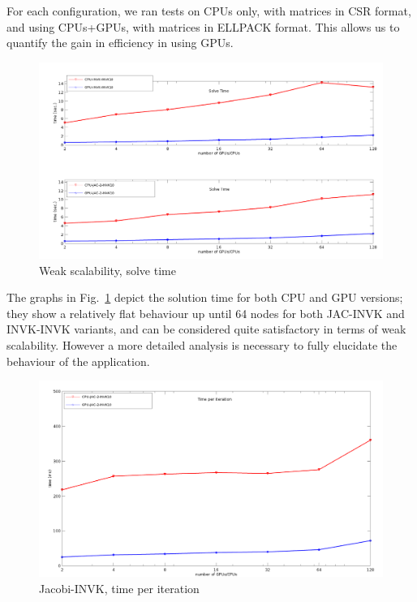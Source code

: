 For each configuration, we ran tests on CPUs only, with matrices in
CSR format, and using CPUs+GPUs, with matrices in ELLPACK format. This
allows us to quantify the gain in efficiency in using GPUs.   


\begin{figure}
\begin{center}
\includegraphics[width=.9\textwidth]{graf_solve_1.png}
\end{center}
\caption{Weak scalability, solve time\label{fig:solve_time}}
\end{figure}
The graphs in Fig.~\ref{fig:solve_time} depict the solution time for
both CPU and GPU versions; they show a relatively flat 
behaviour up until 64 nodes for both JAC-INVK and INVK-INVK variants,
and can be considered quite satisfactory in terms of weak scalability.
However a more detailed analysis is necessary to fully elucidate the
behaviour of the application. 

\begin{figure}[h!]
\centering
\includegraphics[width=1\textwidth]{graf_time_per_it3a.png}
\caption{Jacobi-INVK, time per iteration\label{fig:time_per_it_a}}
\end{figure}

